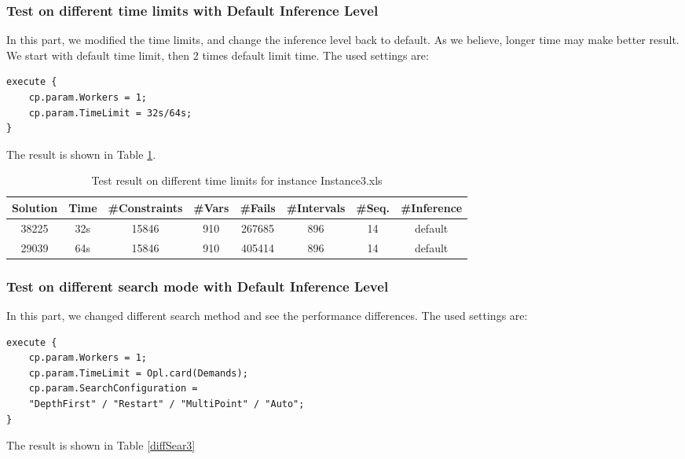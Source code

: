 \documentclass[a4paper, 12pt]{article}
\begin{document}
\subsubsection{Test on different time limits with Default Inference Level}

In this part, we modified the time limits, and change the inference level back to default. As we believe, longer time may make better result. We start with default time limit, then 2 times default limit time. The used settings are: 

\begin{lstlisting}
execute {
    cp.param.Workers = 1;
    cp.param.TimeLimit = 32s/64s; 
}
\end{lstlisting}

The result is shown in Table \ref{diffTime3}.
\begin{table}
    \centering
    \caption{Test result on different time limits for instance Instance3.xls}
    \label{diffTime3}
    \begin{tabular}{|c|c|c|c|c|c|c|c|}
        \hline
        Solution & Time & \#Constraints & \#Vars & \#Fails & \#Intervals & \#Seq. & \#Inference \\
        \hline
        38225 & 32s & 15846 & 910 & 267685 & 896 & 14 & default \\
        \hline 
        29039 & 64s & 15846 & 910 & 405414 & 896 & 14 & default \\
        \hline
    \end{tabular}
\end{table}

\subsubsection{Test on different search mode with Default Inference Level}

In this part, we changed different search method and see the performance differences. The used settings are: 

\begin{lstlisting}
execute {
    cp.param.Workers = 1;
    cp.param.TimeLimit = Opl.card(Demands); 
    cp.param.SearchConfiguration = 
    "DepthFirst" / "Restart" / "MultiPoint" / "Auto";
}
\end{lstlisting}

The result is shown in Table \ref{diffSear3}
\end{document}
